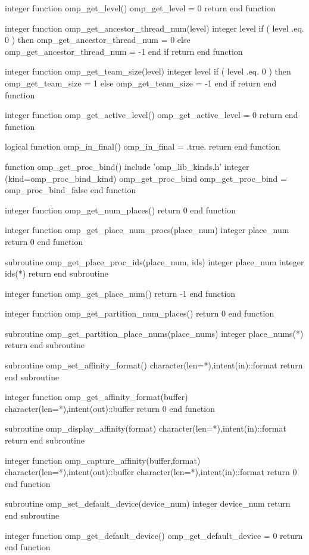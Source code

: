 {\begin{ompfFunction}
integer function omp_get_level()
  omp_get_level = 0
  return
end function

integer function omp_get_ancestor_thread_num(level)
  integer level
  if ( level .eq. 0 ) then
     omp_get_ancestor_thread_num = 0
  else
     omp_get_ancestor_thread_num = -1
  end if
  return
end function

integer function omp_get_team_size(level)
  integer level
  if ( level .eq. 0 ) then
     omp_get_team_size = 1
  else
     omp_get_team_size = -1
  end if
  return
end function

integer function omp_get_active_level()
  omp_get_active_level = 0
  return
end function

logical function omp_in_final()
  omp_in_final = .true.
  return
end function

function omp_get_proc_bind()
  include 'omp_lib_kinds.h'
  integer (kind=omp_proc_bind_kind) omp_get_proc_bind
  omp_get_proc_bind = omp_proc_bind_false
end function

integer function omp_get_num_places()
  return 0
end function

integer function omp_get_place_num_procs(place_num)
  integer place_num
  return 0
end function

subroutine omp_get_place_proc_ids(place_num, ids)
  integer place_num
  integer ids(*)
  return
end subroutine

integer function omp_get_place_num()
  return -1
end function

integer function omp_get_partition_num_places()
  return 0
end function

subroutine omp_get_partition_place_nums(place_nums)
  integer place_nums(*)
  return
end subroutine


subroutine omp_set_affinity_format()
   character(len=*),intent(in)::format
   return
end subroutine

integer function omp_get_affinity_format(buffer)
   character(len=*),intent(out)::buffer
   return 0
end function

subroutine omp_display_affinity(format)
   character(len=*),intent(in)::format
   return
end subroutine

integer function omp_capture_affinity(buffer,format)
   character(len=*),intent(out)::buffer
   character(len=*),intent(in)::format
   return 0
end function

subroutine omp_set_default_device(device_num)
  integer device_num
  return
end subroutine

integer function omp_get_default_device()
  omp_get_default_device = 0
  return
end function


\end{ompfFunction}}

